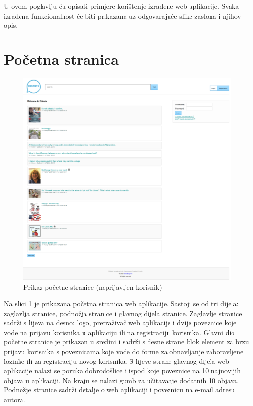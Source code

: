 \documentclass{foi}
\begin{document}
U ovom poglavlju ću opisati primjere korištenje izrađene web aplikacije. Svaka izrađena funkcionalnost će biti prikazana uz odgovarajuće slike zaslona i njihov opis.

\section{Početna stranica}

\begin{figure}[h!]
    \centering
    \includegraphics[width=1\textwidth]{slike/pocetna.png}
    \caption{Prikaz početne stranice (neprijavljen korisnik)}
    \label{pocetna}
\end{figure}

Na slici \ref{pocetna} je prikazana početna stranica web aplikacije. Sastoji se od tri dijela: zaglavlja stranice, podnožja stranice i glavnog dijela stranice. Zaglavlje stranice sadrži s lijeva na desno: logo, pretraživač web aplikacije i dvije poveznice koje vode na prijavu korisnika u aplikaciju ili na registraciju korisnika. Glavni dio početne stranice je prikazan u sredini i sadrži s desne strane blok element za brzu prijavu korisnika s poveznicama koje vode do forme za obnavljanje zaboravljene lozinke ili za registraciju novog korisnika. S lijeve strane glavnog dijela web aplikacije nalazi se poruka dobrodošlice i ispod koje poveznice na 10 najnovijih objava u aplikaciji. Na kraju se nalazi gumb za učitavanje dodatnih 10 objava. Podnožje stranice sadrži detalje o web aplikaciji i poveznicu na e-mail adresu autora.
\end{document}
